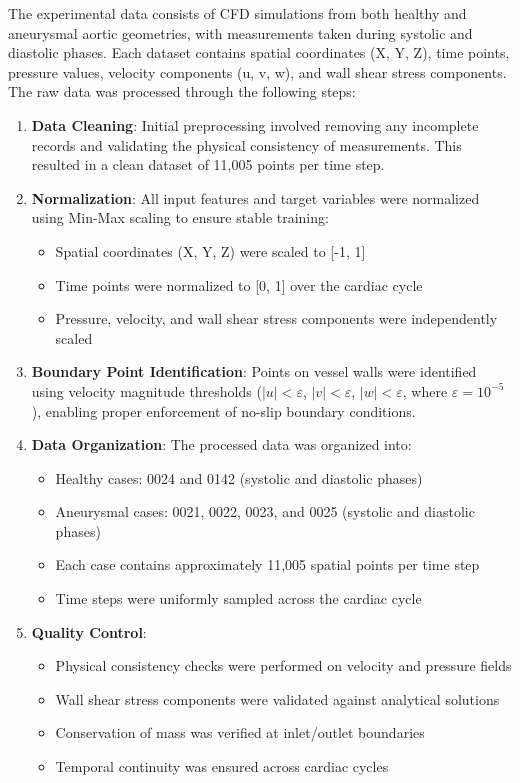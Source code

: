 \documentclass[12pt, a4paper]{article}
\begin{document}
The experimental data consists of CFD simulations from both healthy and aneurysmal aortic geometries, with measurements taken during systolic and diastolic phases. Each dataset contains spatial coordinates (X, Y, Z), time points, pressure values, velocity components (u, v, w), and wall shear stress components. The raw data was processed through the following steps:

\begin{enumerate}
    \item \textbf{Data Cleaning}: Initial preprocessing involved removing any incomplete records and validating the physical consistency of measurements. This resulted in a clean dataset of 11,005 points per time step.
    
    \item \textbf{Normalization}: All input features and target variables were normalized using Min-Max scaling to ensure stable training:
    \begin{itemize}
        \item Spatial coordinates (X, Y, Z) were scaled to [-1, 1]
        \item Time points were normalized to [0, 1] over the cardiac cycle
        \item Pressure, velocity, and wall shear stress components were independently scaled
    \end{itemize}
    
    \item \textbf{Boundary Point Identification}: Points on vessel walls were identified using velocity magnitude thresholds ($|u| < \varepsilon$, $|v| < \varepsilon$, $|w| < \varepsilon$, where $\varepsilon = 10^{-5}$), enabling proper enforcement of no-slip boundary conditions.
    
    \item \textbf{Data Organization}: The processed data was organized into:
    \begin{itemize}
        \item Healthy cases: 0024 and 0142 (systolic and diastolic phases)
        \item Aneurysmal cases: 0021, 0022, 0023, and 0025 (systolic and diastolic phases)
        \item Each case contains approximately 11,005 spatial points per time step
        \item Time steps were uniformly sampled across the cardiac cycle
    \end{itemize}
    
    \item \textbf{Quality Control}:
    \begin{itemize}
        \item Physical consistency checks were performed on velocity and pressure fields
        \item Wall shear stress components were validated against analytical solutions
        \item Conservation of mass was verified at inlet/outlet boundaries
        \item Temporal continuity was ensured across cardiac cycles
    \end{itemize}
\end{enumerate}
\end{document}
